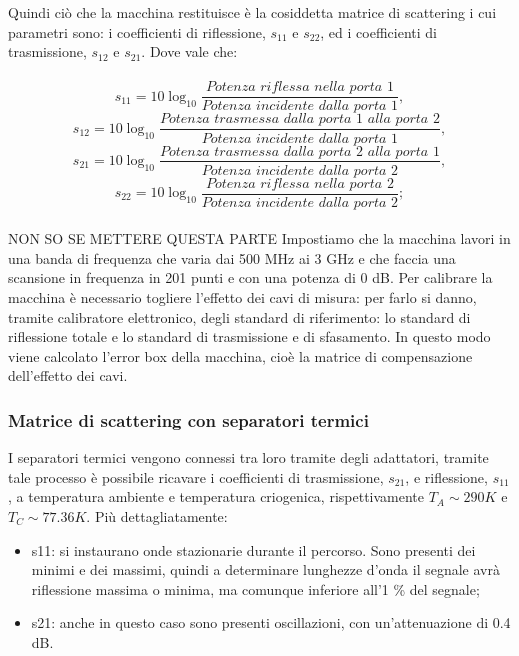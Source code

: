 Quindi ciò che la macchina restituisce è la cosiddetta matrice di scattering i cui parametri sono: i coefficienti di riflessione, \textit{$s_{11}$} e \textit{$s_{22}$}, ed i coefficienti di trasmissione, \textit{$s_{12}$} e \textit{$s_{21}$}. Dove vale che:\\\\
\begin{equation}
    s_{11}=10\log_{10} \frac{Potenza\,\,riflessa\,\,nella\,\,porta\,\,1}{Potenza\,\,incidente\,\,dalla\,\,porta\,\,1},
\end{equation}
\begin{equation}
    s_{12}=10\log_{10} \frac{Potenza\,\,trasmessa\,\,dalla\,\,porta\,\,1\,\,alla\,\,porta\,\,2}{Potenza\,\,incidente\,\,dalla\,\,porta\,\,1},
\end{equation}
\begin{equation}
    s_{21}=10\log_{10} \frac{Potenza\,\,trasmessa\,\,dalla\,\,porta\,\,2\,\,alla\,\,porta\,\,1}{Potenza\,\,incidente\,\,dalla\,\,porta\,\,2},
\end{equation}
\begin{equation}
    s_{22}=10\log_{10} \frac{Potenza\,\,riflessa\,\,nella\,\,porta\,\,2}{Potenza\,\,incidente\,\,dalla\,\,porta\,\,2};
\end{equation}
\\NON SO SE METTERE QUESTA PARTE
Impostiamo che la macchina lavori in una banda di frequenza che varia dai 500 MHz ai 3 GHz e che faccia una scansione in frequenza in 201 punti e con una potenza di 0 dB. Per calibrare la macchina è necessario togliere l’effetto dei cavi di misura: per farlo si danno, tramite calibratore elettronico, degli standard di riferimento: lo standard di riflessione totale e lo standard di trasmissione e di sfasamento. In questo modo viene calcolato l’error box della macchina, cioè la matrice di compensazione dell’effetto dei cavi.


\subsubsection{Matrice di scattering con separatori termici}

I separatori termici vengono connessi tra loro tramite degli adattatori, tramite tale processo è possibile ricavare i coefficienti di trasmissione, $ s_{21} $, e riflessione, $ s_{11} $, a temperatura ambiente e temperatura criogenica, rispettivamente $ T_{A}\sim290K $ e $ T_{C} \sim77.36K $. Più dettagliatamente:

\begin{itemize}
\item s11: si instaurano onde stazionarie durante il percorso. Sono presenti dei minimi e dei massimi, quindi a determinare lunghezze d'onda il segnale avrà riflessione massima o minima, ma comunque inferiore all'1 \% del segnale;
\item s21: anche in questo caso sono presenti oscillazioni, con un'attenuazione di 0.4 dB.
\end{itemize}


